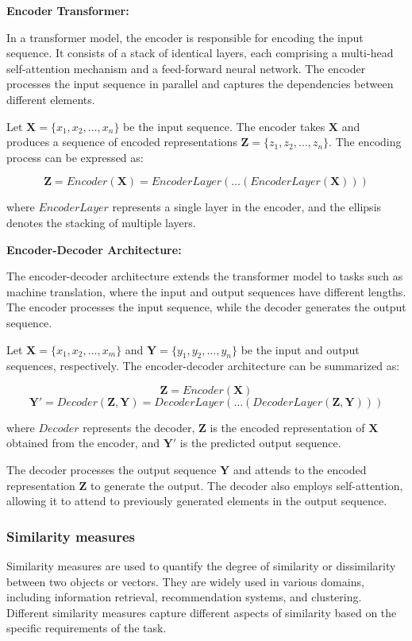 \documentclass[a4paper,12pt]{article}
\begin{document}
\textbf{Encoder Transformer:}

In a transformer model, the encoder is responsible for encoding the input sequence. It consists of a stack of identical layers, each comprising a multi-head self-attention mechanism and a feed-forward neural network. The encoder processes the input sequence in parallel and captures the dependencies between different elements.

Let $\mathbf{X} = \{x_1, x_2, \ldots, x_n\}$ be the input sequence. The encoder takes $\mathbf{X}$ and produces a sequence of encoded representations $\mathbf{Z} = \{z_1, z_2, \ldots, z_n\}$. The encoding process can be expressed as:

$$\mathbf{Z} = Encoder(\mathbf{X}) = EncoderLayer(\ldots(EncoderLayer(\mathbf{X})))$$

where $EncoderLayer$ represents a single layer in the encoder, and the ellipsis denotes the stacking of multiple layers.

\textbf{Encoder-Decoder Architecture:}

The encoder-decoder architecture extends the transformer model to tasks such as machine translation, where the input and output sequences have different lengths. The encoder processes the input sequence, while the decoder generates the output sequence.

Let $\mathbf{X} = \{x_1, x_2, \ldots, x_m\}$ and $\mathbf{Y} = \{y_1, y_2, \ldots, y_n\}$ be the input and output sequences, respectively. The encoder-decoder architecture can be summarized as:

$$\mathbf{Z} = Encoder(\mathbf{X})$$
$$\mathbf{Y'} = Decoder(\mathbf{Z}, \mathbf{Y}) = DecoderLayer(\ldots(DecoderLayer(\mathbf{Z}, \mathbf{Y})))$$

where $Decoder$ represents the decoder, $\mathbf{Z}$ is the encoded representation of $\mathbf{X}$ obtained from the encoder, and $\mathbf{Y'}$ is the predicted output sequence.

The decoder processes the output sequence $\mathbf{Y}$ and attends to the encoded representation $\mathbf{Z}$ to generate the output. The decoder also employs self-attention, allowing it to attend to previously generated elements in the output sequence.

\subsubsection{Similarity measures}
Similarity measures are used to quantify the degree of similarity or dissimilarity between two objects or vectors. They are widely used in various domains, including information retrieval, recommendation systems, and clustering. Different similarity measures capture different aspects of similarity based on the specific requirements of the task.
\end{document}
